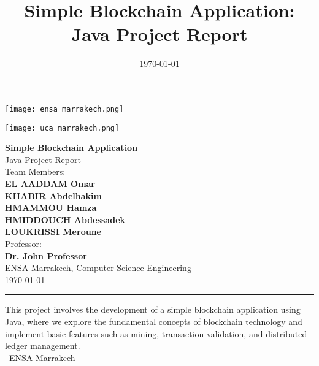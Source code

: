 \documentclass[12pt,a4paper]{report}
\title{\color{headercolor}\textbf{Simple Blockchain Application: Java Project Report}}
\author{}
\date{\today}
\begin{document}
\begin{titlepage}
    \begin{minipage}[t]{0.48\textwidth}
        \vspace{-2cm}
        \hspace{-3cm}
        \texttt{[image: ensa\_marrakech.png]} %
    \end{minipage}%
    \hfill
    \begin{minipage}[t]{0.48\textwidth}
        \vspace{-3.5cm}
        \hspace{2.5cm}
        \texttt{[image: uca\_marrakech.png]} %
    \end{minipage}

    \vspace{1cm}

    \centering
    \Huge{\textbf{\color{headercolor} Simple Blockchain Application}}\\[1em]

    \Large{Java Project Report}\\[2em]

    \Large{Team Members:}\\
    \textbf{EL AADDAM Omar}\\
    \textbf{KHABIR Abdelhakim}\\
    \textbf{HMAMMOU Hamza}\\
    \textbf{HMIDDOUCH Abdessadek}\\
    \textbf{LOUKRISSI Meroune}\\
    \Large{Professor:}\\
    \textbf{Dr. John Professor}\\[2em]

    \Large{ENSA Marrakech, Computer Science Engineering}\\[1em]
    \Large{\today}\\[2em]

    \rule{\textwidth}{0.4pt}\vspace{0.4cm}

    \large{This project involves the development of a simple blockchain application using Java, where we explore the fundamental concepts of blockchain technology and implement basic features such as mining, transaction validation, and distributed ledger management.}\\[1em]

    \vfill
    \large{\faUniversity\ ENSA Marrakech}
\end{titlepage}
\end{document}
